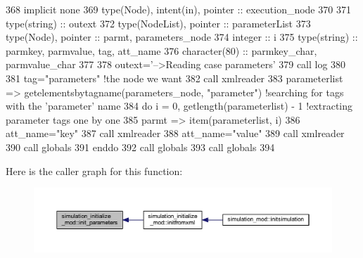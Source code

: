 \begin{DoxyCode}
368     \textcolor{keywordtype}{implicit none}
369     \textcolor{keywordtype}{type}(Node), \textcolor{keywordtype}{intent(in)}, \textcolor{keywordtype}{pointer} :: execution\_node
370 
371     \textcolor{keywordtype}{type}(string) :: outext
372     \textcolor{keywordtype}{type}(NodeList), \textcolor{keywordtype}{pointer} :: parameterList
373     \textcolor{keywordtype}{type}(Node), \textcolor{keywordtype}{pointer} :: parmt, parameters\_node
374     \textcolor{keywordtype}{integer} :: i
375     \textcolor{keywordtype}{type}(string) :: parmkey, parmvalue, tag, att\_name
376     \textcolor{keywordtype}{character(80)} :: parmkey\_char, parmvalue\_char
377 
378     outext=\textcolor{stringliteral}{'-->Reading case parameters'}
379     \textcolor{keyword}{call }log%
380 
381     tag=\textcolor{stringliteral}{"parameters"}    \textcolor{comment}{!the node we want}
382     \textcolor{keyword}{call }xmlreader%
383     parameterlist => getelementsbytagname(parameters\_node, \textcolor{stringliteral}{"parameter"})       \textcolor{comment}{!searching for tags with the
       'parameter' name}
384     \textcolor{keywordflow}{do} i = 0, getlength(parameterlist) - 1                          \textcolor{comment}{!extracting parameter tags one by one}
385         parmt => item(parameterlist, i)
386         att\_name=\textcolor{stringliteral}{"key"}
387         \textcolor{keyword}{call }xmlreader%
388         att\_name=\textcolor{stringliteral}{"value"}
389         \textcolor{keyword}{call }xmlreader%
390         \textcolor{keyword}{call }globals%
391 \textcolor{keywordflow}{    enddo}
392     \textcolor{keyword}{call }globals%
393     \textcolor{keyword}{call }globals%
394 
\end{DoxyCode}
Here is the caller graph for this function\+:\nopagebreak
\begin{figure}[H]
\begin{center}
\leavevmode
\includegraphics[width=350pt]{namespacesimulation__initialize__mod_a4ee29d81788bb77840a67af18784da66_icgraph}
\end{center}
\end{figure}
\mbox{\label{namespacesimulation__initialize__mod_a7b30af4cf1a6ee74a4b2c6e8c9d1d98d}} 
